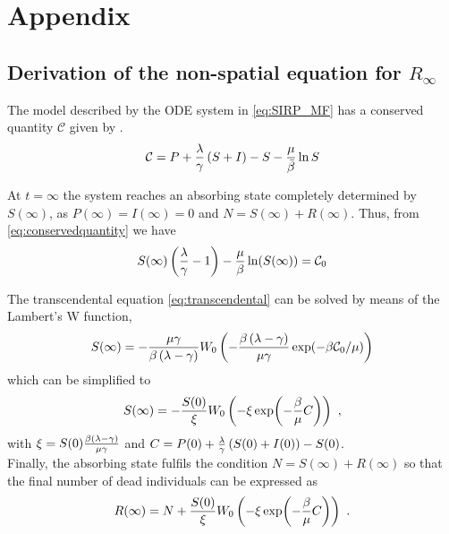 \section{Appendix}

\subsection{Derivation of the non-spatial equation for $R_{\infty}$}
\label{app:Rinf}

The model described by the ODE system in \cref{eq:SIRP_MF} has a conserved
quantity $\mathcal{C}$ given by \cite{GimenezRomero2021}.
\begin{equation}\label{eq:conservedquantity}
    \mathcal{C}=P +
    \frac{\lambda}{\gamma}\left(S+I\right)-S-\frac{\mu}{\bar{\beta}}\ln S
\end{equation}

At $t=\infty$ the system reaches an absorbing state completely determined
by $S(\infty)$, as $P(\infty)=I(\infty)=0$ and $N=S(\infty)+R(\infty)$. Thus,
from \cref{eq:conservedquantity} we have
\begin{equation}\label{eq:transcendental}
    S(\infty)\left(\frac{\lambda}{\gamma}-1\right)-
    \frac{\mu}{\beta}\ln(S(\infty))=\mathcal{C}_0
\end{equation}

The transcendental equation \cref{eq:transcendental} can be solved by means
of the Lambert's W function,
\begin{equation}
    S(\infty)=-\frac{\mu\gamma}{\beta\left(\lambda-\gamma\right)}
    W_0\left(-\frac{\beta\left(\lambda-\gamma\right)}{\mu\gamma}
        \exp(-\beta\mathcal{C}_0/\mu)\right)
\end{equation}
which can be simplified to
\begin{equation}\label{eq: S_inf}
    S(\infty)=-\frac{S(0)}{\xi}W_0\left(-\xi\exp(-\frac{\beta}{\mu}C)\right)
    \ ,
\end{equation}
with $\xi=S(0)\frac{\beta\left(\lambda-\gamma\right)}{\mu\gamma}$ and
$C=P(0)+\frac{\lambda}{\gamma}\left(S(0)+I(0)\right)-S(0)$.\\

Finally, the absorbing state fulfils the condition $N=S(\infty)+R(\infty)$
so that the final number of dead individuals can be expressed as
\begin{equation}
    R(\infty)=N+\frac{S(0)}{\xi}W_0\left(-\xi\exp(-\frac{\beta}{\mu}C)\right) \
    .
\end{equation}